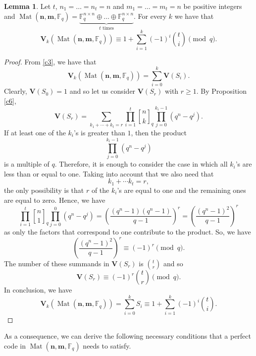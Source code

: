 \documentclass[11pt]{amsart}
\DeclareMathOperator{\Mat}{Mat}
\theoremstyle{definition}
\newtheorem{lemma}[theorem]{Lemma}
\newtheorem{remark}[theorem]{Remark}
\newcommand{\F}{{\mathbb F}}
\newcommand{\bfn}{\mathbf {n}}
\newcommand{\bfm}{\mathbf {m}}
\renewcommand{\mod}{\hbox{{\rm mod}\,}}
\newcommand{\spacmn}{\Mat(\bfn,\bfm,\F_q)}
\newcommand{\qbinom}[2]{\genfrac{[}{]}{0pt}{}{#1}{#2}_q}
\begin{document}

\begin{lemma}
Let $t$, $ n_1 = \ldots = n_t = n $ and $ m_1 = \ldots = m_t = n $ be positive integers and $\spacmn=\underbrace{\mathbb{F}_q^{n\times n}\oplus \ldots \oplus \F_q^{n\times n}}_{t \text{ times}}$.
For every $k$ we have that
\[
\mathbf{V}_k(\spacmn)\equiv1+\sum_{i=1}^{k}(-1)^i\binom{t}{i}\pmod{q}.
\]
\end{lemma}
\begin{proof}
From \eqref{c3}, we have that
\[
\mathbf{V}_k(\spacmn)=\sum_{i=0}^{k}\mathbf{V}(S_i).
\]
Clearly, $\mathbf{V}(S_0)=1$ and so let us consider $\mathbf{V}(S_r)$ with $r\geq 1$.
By Proposition \ref{c6},
\[
\mathbf{V}(S_r)=\sum_{k_1+\cdots+k_t=r}\prod_{i=1}^{t}\qbinom{n}{k}\prod_{j=0}^{k_i-1}(q^n-q^j).
\]
If at least one of the $k_i$'s is greater than $1$, then the product
\[
\prod_{j=0}^{k_i-1}(q^n-q^j)
\]
is a multiple of $q$. 
Therefore, it is enough to consider the case in which all $k_i$'s are less than or equal to one.
Taking into account that we also need that
\[
k_1+\cdots k_t=r,
\]
the only possibility is that $r$ of the $k_i$'s are equal to one and the remaining ones are equal to zero. 
Hence, we have
\[
\prod_{i=1}^{t}\qbinom{n}{1}\prod_{j=0}^{0}(q^n-q^j)=\left(\frac{(q^n-1)(q^n-1)}{q-1}\right)^r=\left(\frac{(q^n-1)^2}{q-1}\right)^r
\]
as only the factors that correspond to one contribute to the product. So, we have
\[
\left(\frac{(q^n-1)^2}{q-1}\right)^r\equiv(-1)^r\pmod{q}.
\]
The number of these summands in $\mathbf{V}(S_r)$ is $\binom{t}{r}$ and so
 \[
 \mathbf{V}(S_r)\equiv (-1)^r\binom{t}{r}\pmod{q}.
 \]
In conclusion, we have 
\[
 \mathbf{V}_k(\spacmn)=\sum_{i=0}^{k}S_i\equiv1+\sum_{i=1}^{k}(-1)^i\binom{t}{i}.
 \]
\end{proof}

As a consequence, we can derive the following necessary conditions that a perfect code in $\spacmn$ needs to satisfy.
\end{document}
